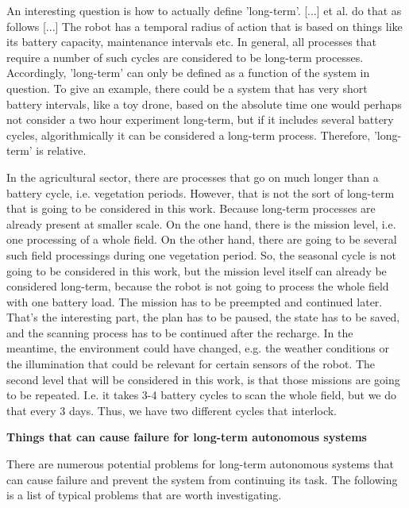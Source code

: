 \documentclass[german, master, expose, latin1]{base/thesis_KBS}
\begin{document}
An interesting question is how to actually define 'long-term'. [...] et al. do that as follows [...] The robot has a temporal radius of action that is based
on things like its battery capacity, maintenance intervals etc. In general, all processes that require a number of such cycles are considered to be long-term processes.
Accordingly, 'long-term' can only be defined as a function of the system in question. To give an example, there could be a system that has very short battery intervals,
like a toy drone, based on the absolute time one would perhaps not consider a two hour experiment long-term, but if it includes several battery cycles, algorithmically
it can be considered a long-term process. Therefore, 'long-term' is relative.\newline

In the agricultural sector, there are processes that go on much longer than a battery cycle, i.e. vegetation periods.
However, that is not the sort of long-term that is going to be considered in this work. Because long-term processes are already present at smaller scale.
On the one hand, there is the mission level, i.e. one processing of a whole field. On the other hand, there are going to be several such field processings during one vegetation
period. So, the seasonal cycle is not going to be considered in this work, but the mission level itself can already be considered long-term, because the robot is not
going to process the whole field with one battery load. The mission has to be preempted and continued later. That's the interesting part, the plan has to be paused,
the state has to be saved, and the scanning process has to be continued after the recharge. In the meantime, the environment could have changed, e.g. the weather conditions
or the illumination that could be relevant for certain sensors of the robot. The second level that will be considered in this work, is that those missions are going
to be repeated. I.e. it takes 3-4 battery cycles to scan the whole field, but we do that every 3 days. Thus, we have two different cycles that interlock.\newline

\textbf{Things that can cause failure for long-term autonomous systems}\newline

There are numerous potential problems for long-term autonomous systems that can cause failure and prevent the system from continuing its task.
The following is a list of typical problems that are worth investigating.
\end{document}
